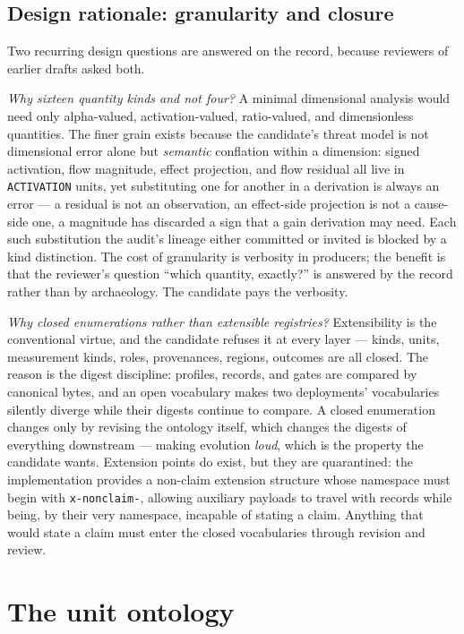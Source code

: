 \subsection{Design rationale: granularity and closure}\label{ch03:measurement:rationale}

Two recurring design questions are answered on the record, because reviewers of earlier drafts asked both.

\emph{Why sixteen quantity kinds and not four?} A minimal dimensional analysis would need only alpha-valued, activation-valued, ratio-valued, and dimensionless quantities. The finer grain exists because the candidate's threat model is not dimensional error alone but \emph{semantic} conflation within a dimension: signed activation, flow magnitude, effect projection, and flow residual all live in \texttt{ACTIVATION} units, yet substituting one for another in a derivation is always an error --- a residual is not an observation, an effect-side projection is not a cause-side one, a magnitude has discarded a sign that a gain derivation may need. Each such substitution the audit's lineage either committed or invited is blocked by a kind distinction. The cost of granularity is verbosity in producers; the benefit is that the reviewer's question ``which quantity, exactly?'' is answered by the record rather than by archaeology. The candidate pays the verbosity.

\emph{Why closed enumerations rather than extensible registries?} Extensibility is the conventional virtue, and the candidate refuses it at every layer --- kinds, units, measurement kinds, roles, provenances, regions, outcomes are all closed. The reason is the digest discipline: profiles, records, and gates are compared by canonical bytes, and an open vocabulary makes two deployments' vocabularies silently diverge while their digests continue to compare. A closed enumeration changes only by revising the ontology itself, which changes the digests of everything downstream --- making evolution \emph{loud}, which is the property the candidate wants. Extension points do exist, but they are quarantined: the implementation provides a non-claim extension structure whose namespace must begin with \texttt{x-nonclaim-}, allowing auxiliary payloads to travel with records while being, by their very namespace, incapable of stating a claim. Anything that would state a claim must enter the closed vocabularies through revision and review.

\section{The unit ontology}\label{ch03:units}

